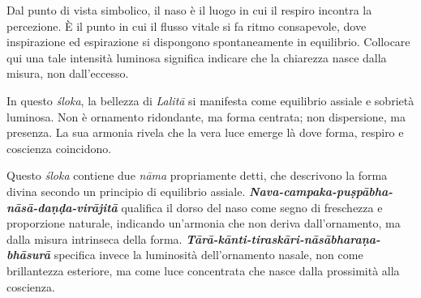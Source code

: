 Dal punto di vista simbolico, il naso è il luogo in cui il respiro incontra la percezione. È il punto in cui il flusso vitale si fa ritmo consapevole, dove inspirazione ed espirazione si dispongono spontaneamente in equilibrio. Collocare qui una tale intensità luminosa significa indicare che la chiarezza nasce dalla misura, non dall’eccesso.

In questo \textit{śloka}, la bellezza di \textit{Lalitā} si manifesta come equilibrio assiale e sobrietà luminosa. Non è ornamento ridondante, ma forma centrata; non dispersione, ma presenza. La sua armonia rivela che la vera luce emerge là dove forma, respiro e coscienza coincidono.

Questo \textit{śloka} contiene due \textit{nāma} propriamente detti, che descrivono la forma divina secondo un principio di equilibrio assiale. \textbf{\textit{Nava-campaka-puṣpābha-nāsā-daṇḍa-virājitā}} qualifica il dorso del naso come segno di freschezza e proporzione naturale, indicando un’armonia che non deriva dall’ornamento, ma dalla misura intrinseca della forma. \textbf{\textit{Tārā-kānti-tiraskāri-nāsābharaṇa-bhāsurā}} specifica invece la luminosità dell’ornamento nasale, non come brillantezza esteriore, ma come luce concentrata che nasce dalla prossimità alla coscienza.

